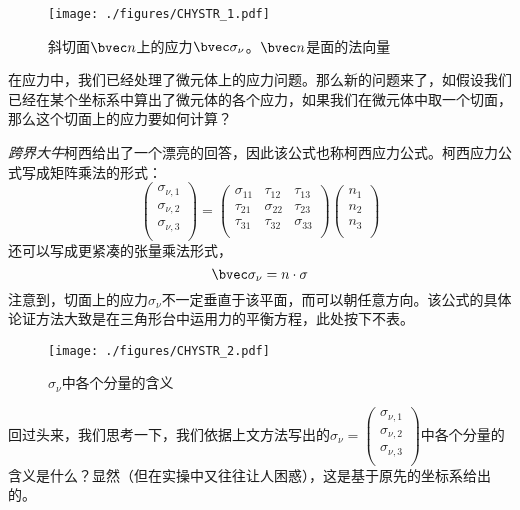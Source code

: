 

\begin{figure}[ht]
\centering
\texttt{[image: ./figures/CHYSTR\_1.pdf]}
\caption{斜切面$\bvec n$上的应力$\bvec \sigma_\nu$。$\bvec n$是面的法向量} \label{CHYSTR_fig1}
\end{figure}

在应力中，我们已经处理了微元体上的应力问题。那么新的问题来了，如假设我们已经在某个坐标系中算出了微元体的各个应力，如果我们在微元体中取一个切面，那么这个切面上的应力要如何计算？

\textsl{跨界大牛}柯西给出了一个漂亮的回答，因此该公式也称柯西应力公式。柯西应力公式写成矩阵乘法的形式：
\begin{equation}
\begin{pmatrix}
\sigma_{\nu,1}\\
\sigma_{\nu,2}\\
\sigma_{\nu,3}\\
\end{pmatrix}
=
\begin{pmatrix}
\sigma_{11} & \tau_{12} & \tau_{13} \\
\tau_{21} & \sigma_{22} & \tau_{23} \\
\tau_{31} & \tau_{32} & \sigma_{33} \\
\end{pmatrix}
\begin{pmatrix}
n_1\\
n_2\\
n_3\\
\end{pmatrix}
\end{equation}
还可以写成更紧凑的张量乘法形式，
\begin{equation}
\bvec \sigma_\nu = n \cdot \sigma
\end{equation}
注意到，切面上的应力$\sigma_\nu$不一定垂直于该平面，而可以朝任意方向。该公式的具体论证方法大致是在三角形台中运用力的平衡方程，此处按下不表。

\begin{figure}[ht]
\centering
\texttt{[image: ./figures/CHYSTR\_2.pdf]}
\caption{$\sigma_\nu$中各个分量的含义} \label{CHYSTR_fig2}
\end{figure}

回过头来，我们思考一下，我们依据上文方法写出的$\sigma_\nu=
\begin{pmatrix}
\sigma_{\nu,1}\\
\sigma_{\nu,2}\\
\sigma_{\nu,3}\\
\end{pmatrix}$中各个分量的含义是什么？显然（但在实操中又往往让人困惑），这是基于原先的坐标系给出的。

